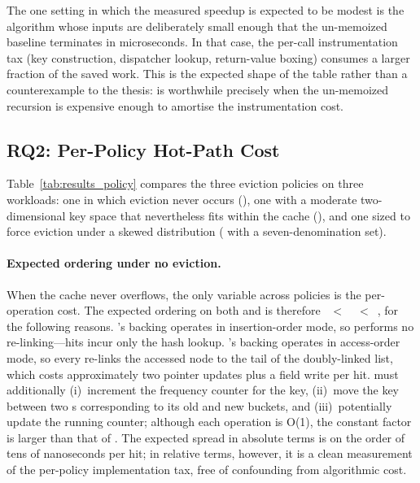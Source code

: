 The one setting in which the measured speedup is expected to be modest is the algorithm whose inputs are deliberately small enough that the un-memoized baseline terminates in microseconds. In that case, the per-call instrumentation tax (key construction, dispatcher lookup, return-value boxing) consumes a larger fraction of the saved work. This is the expected shape of the table rather than a counterexample to the thesis:  is worthwhile precisely when the un-memoized recursion is expensive enough to amortise the instrumentation cost.


\subsection{RQ2: Per-Policy Hot-Path Cost}\label{sec:results_rq2}



Table~\ref{tab:results_policy} compares the three eviction policies on three workloads: one in which eviction never occurs (), one with a moderate two-dimensional key space that nevertheless fits within the cache (), and one sized to force eviction under a skewed distribution ( with a seven-denomination set).

\paragraph{Expected ordering under no eviction.} When the cache never overflows, the only variable across policies is the per-operation cost. The expected ordering on both  and  is therefore \fifo~$<$~\lru~$<$~\lfu, for the following reasons. \fifo's backing  operates in insertion-order mode, so  performs no re-linking---hits incur only the hash lookup. \lru's backing  operates in access-order mode, so every  re-links the accessed node to the tail of the doubly-linked list, which costs approximately two pointer updates plus a field write per hit. \lfu must additionally (i)~increment the frequency counter for the key, (ii)~move the key between two s corresponding to its old and new buckets, and (iii)~potentially update the running  counter; although each operation is O(1), the constant factor is larger than that of \lru. The expected spread in absolute terms is on the order of tens of nanoseconds per hit; in relative terms, however, it is a clean measurement of the per-policy implementation tax, free of confounding from algorithmic cost.

